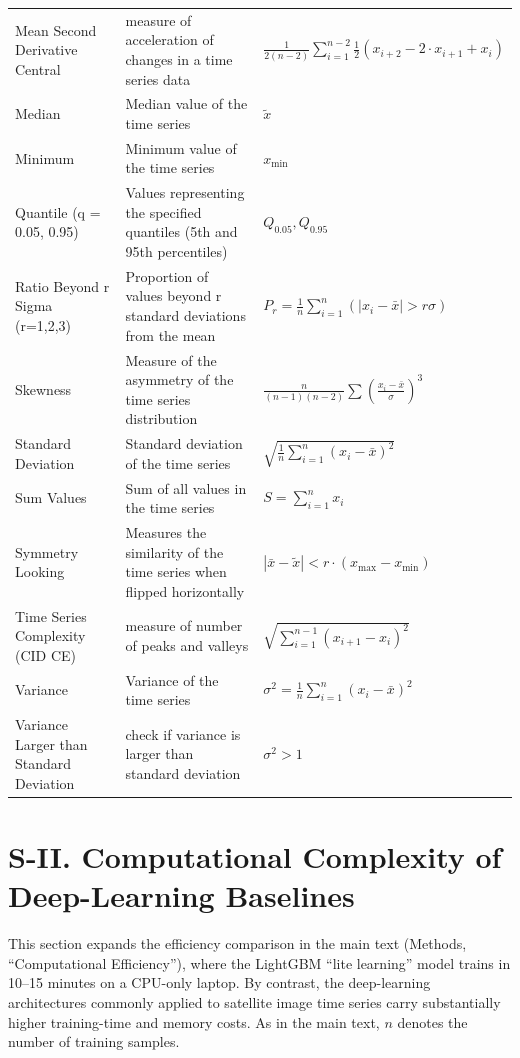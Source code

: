 \documentclass[
  journal,
  onecolumn]{IEEEtran}
\begin{document}
\begin{longtable}{|p{4cm}|p{5cm}|p{6cm}|}
Mean Second Derivative Central & measure of acceleration of changes in a time series data & $\frac{1}{2(n-2)} \sum_{i=1}^{n-2}  \frac{1}{2} (x_{i+2} - 2 \cdot x_{i+1} + x_i)
$ \\
Median & Median value of the time series & $\tilde{x}$ \\
Minimum & Minimum value of the time series & $x_{\text{min}}$ \\
Quantile (q = 0.05, 0.95) & Values representing the specified quantiles (5th and 95th percentiles) & $Q_{0.05}, Q_{0.95}$ \\
Ratio Beyond r Sigma (r=1,2,3) & Proportion of values beyond r standard deviations from the mean & $P_r = \frac{1}{n}\sum_{i=1}^{n} (|x_i - \bar{x}| > r\sigma)$ \\
Skewness & Measure of the asymmetry of the time series distribution & $\frac{n}{(n-1)(n-2)} \sum \left(\frac{x_i - \bar{x}}{\sigma}\right)^3$ \\
Standard Deviation & Standard deviation of the time series & $\sqrt{\frac{1}{n}\sum_{i=1}^{n} (x_i - \bar{x})^2}$ \\
Sum Values & Sum of all values in the time series & $S = \sum_{i=1}^{n} x_i$ \\
Symmetry Looking & Measures the similarity of the time series when flipped horizontally & $| \bar{x}-\tilde{x} | < r \cdot (x_{\text{max}} - x_{\text{min}} ) $ \\
Time Series Complexity (CID CE) & measure of number of peaks and valleys & $\sqrt{ \sum_{i=1}^{n-1} ( x_{i+1} - x_{i})^2 }$\\
Variance & Variance of the time series & $\sigma^2 = \frac{1}{n}\sum_{i=1}^{n} (x_i - \bar{x})^2$ \\
Variance Larger than Standard Deviation & check if variance is larger than standard deviation & $\sigma^2 > 1$ \\
\hline
\end{longtable}

\section{S-II. Computational Complexity of Deep-Learning
Baselines}\label{s-ii.-computational-complexity-of-deep-learning-baselines}

This section expands the efficiency comparison in the main text
(Methods, ``Computational Efficiency''), where the LightGBM ``lite
learning'' model trains in 10--15 minutes on a CPU-only laptop. By
contrast, the deep-learning architectures commonly applied to satellite
image time series carry substantially higher training-time and memory
costs. As in the main text, \(n\) denotes the number of training
samples.
\end{document}
